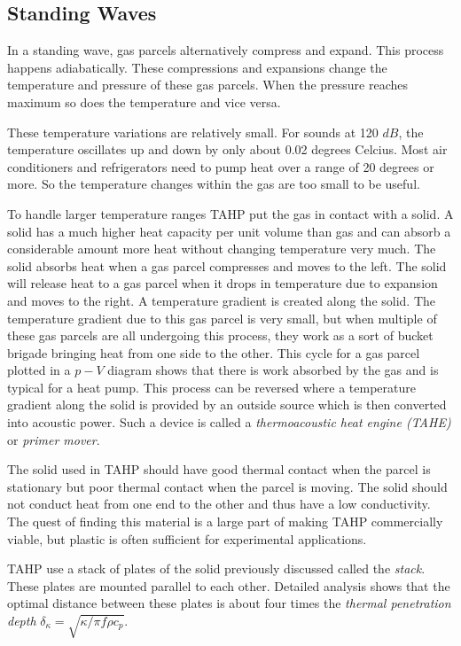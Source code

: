 \documentclass[a4paper]{article}
\newcommand{\newpara}
    {
      \bigbreak{}
      \noindent
    }
\begin{document}
\subsection{Standing Waves\cite{powerofsound,enginesandrefrigerators,tijaniLoudSpeaker}}
In a standing wave, gas parcels alternatively compress and expand. This process happens adiabatically. These compressions and expansions change the temperature and pressure of these gas parcels. When the pressure reaches maximum so does the temperature and vice versa.
\newpara{}
These temperature variations are relatively small. For sounds at 120 \(dB\), the temperature oscillates up and down by only about 0.02 degrees Celcius. Most air conditioners and refrigerators need to pump heat over a range of 20 degrees or more. So the temperature changes within the gas are too small to be useful.
\newpara{}
To handle larger temperature ranges TAHP put the gas in contact with a solid. A solid has a much higher heat capacity per unit volume than gas and can absorb a considerable amount more heat without changing temperature very much. The solid absorbs heat when a gas parcel compresses and moves to the left. The solid will release heat to a gas parcel when it drops in temperature due to expansion and moves to the right. A temperature gradient is created along the solid. The temperature gradient due to this gas parcel is very small, but when multiple of these gas parcels are all undergoing this process, they work as a sort of bucket brigade bringing heat from one side to the other. %
This cycle for a gas parcel plotted in a \(p-V\) diagram shows that there is work absorbed by the gas and is typical for a heat pump.  %
This process can be reversed where a temperature gradient along the solid is provided by an outside source which is then converted into acoustic power. Such a device is called a \emph{thermoacoustic heat engine (TAHE)} or \emph{primer mover}.
\newpara{}
The solid used in TAHP should have good thermal contact when the parcel is stationary but poor thermal contact when the parcel is moving. The solid should not conduct heat from one end to the other and thus have a low conductivity. The quest of finding this material is a large part of making TAHP commercially viable, but plastic is often sufficient for experimental applications.
\newpara{}
TAHP use a stack of plates of the solid previously discussed called the \emph{stack}. These plates are mounted parallel to each other. Detailed analysis shows that the optimal distance between these plates is about four times the \emph{thermal penetration depth} \(\delta_\kappa = \sqrt{\kappa/\pi f \rho c_p}\). %
\end{document}
